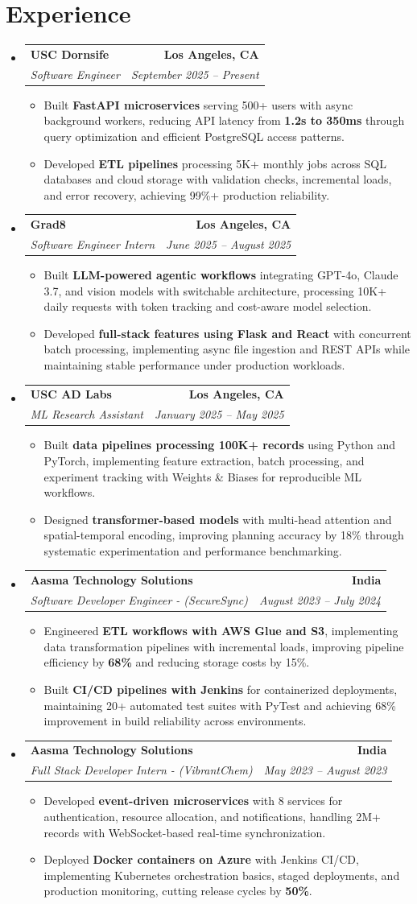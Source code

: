 \documentclass[letterpaper,10pt]{article}
\makeatletter
\newcommand{\resumeItem}[1]{\item\small{{#1 \vspace{-2pt}}}}
\newcommand{\resumeSubheading}[4]{\vspace{-1pt}\item\begin{tabular*}{1.0\textwidth}[t]{l@{\extracolsep{\fill}}r}\textbf{#1} & \textbf{\small #2} \\\textit{\small#3} & \textit{\small #4} \\\end{tabular*}\vspace{-2pt}}
\newcommand{\resumeSubHeadingListStart}{\begin{itemize}[leftmargin=0.0in, label={}]}
\newcommand{\resumeSubHeadingListEnd}{\end{itemize}}
\newcommand{\resumeItemListStart}{\begin{itemize}[leftmargin=0.15in,label=\textbullet,itemsep=2pt,topsep=0pt,parsep=0pt,partopsep=0pt]}
\newcommand{\resumeItemListEnd}{\end{itemize}\vspace{-4pt}}
\makeatother
\begin{document}
\section{Experience}
\resumeSubHeadingListStart
\resumeSubheading{USC Dornsife}{Los Angeles, CA}{Software Engineer}{September 2025 -- Present}
\resumeItemListStart
\resumeItem{Built \textbf{FastAPI microservices} serving 500+ users with async background workers, reducing API latency from \textbf{1.2s to 350ms} through query optimization and efficient PostgreSQL access patterns.}
\resumeItem{Developed \textbf{ETL pipelines} processing 5K+ monthly jobs across SQL databases and cloud storage with validation checks, incremental loads, and error recovery, achieving 99\%+ production reliability.}
\resumeItemListEnd
\resumeSubheading{Grad8}{Los Angeles, CA}{Software Engineer Intern}{June 2025 -- August 2025}
\resumeItemListStart
\resumeItem{Built \textbf{LLM-powered agentic workflows} integrating GPT-4o, Claude 3.7, and vision models with switchable architecture, processing 10K+ daily requests with token tracking and cost-aware model selection.}
\resumeItem{Developed \textbf{full-stack features using Flask and React} with concurrent batch processing, implementing async file ingestion and REST APIs while maintaining stable performance under production workloads.}
\resumeItemListEnd
\resumeSubheading{USC AD Labs}{Los Angeles, CA}{ML Research Assistant}{January 2025 -- May 2025}
\resumeItemListStart
\resumeItem{Built \textbf{data pipelines processing 100K+ records} using Python and PyTorch, implementing feature extraction, batch processing, and experiment tracking with Weights \& Biases for reproducible ML workflows.}
\resumeItem{Designed \textbf{transformer-based models} with multi-head attention and spatial-temporal encoding, improving planning accuracy by 18\% through systematic experimentation and performance benchmarking.}
\resumeItemListEnd
\resumeSubheading{Aasma Technology Solutions}{India}{Software Developer Engineer - (SecureSync)}{August 2023 -- July 2024}
\resumeItemListStart
\resumeItem{Engineered \textbf{ETL workflows with AWS Glue and S3}, implementing data transformation pipelines with incremental loads, improving pipeline efficiency by \textbf{68\%} and reducing storage costs by 15\%.}
\resumeItem{Built \textbf{CI/CD pipelines with Jenkins} for containerized deployments, maintaining 20+ automated test suites with PyTest and achieving 68\% improvement in build reliability across environments.}
\resumeItemListEnd
\resumeSubheading{Aasma Technology Solutions}{India}{Full Stack Developer Intern - (VibrantChem)}{May 2023 -- August 2023}
\resumeItemListStart
\resumeItem{Developed \textbf{event-driven microservices} with 8 services for authentication, resource allocation, and notifications, handling 2M+ records with WebSocket-based real-time synchronization.}
\resumeItem{Deployed \textbf{Docker containers on Azure} with Jenkins CI/CD, implementing Kubernetes orchestration basics, staged deployments, and production monitoring, cutting release cycles by \textbf{50\%}.}
\resumeItemListEnd
\resumeSubHeadingListEnd
\vspace{-14pt}
\end{document}
